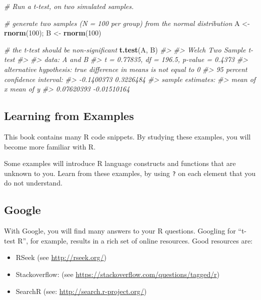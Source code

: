 \documentclass[]{book}
\newenvironment{Shaded}{\begin{snugshade}}{\end{snugshade}}
\newcommand{\KeywordTok}[1]{\textcolor[rgb]{0.13,0.29,0.53}{\textbf{#1}}}
\newcommand{\DecValTok}[1]{\textcolor[rgb]{0.00,0.00,0.81}{#1}}
\newcommand{\StringTok}[1]{\textcolor[rgb]{0.31,0.60,0.02}{#1}}
\newcommand{\CommentTok}[1]{\textcolor[rgb]{0.56,0.35,0.01}{\textit{#1}}}
\newcommand{\NormalTok}[1]{#1}
\begin{document}
\begin{Shaded}
\begin{Highlighting}[]
\CommentTok{# Run a t-test, on two simulated samples.}

\CommentTok{# generate two samples (N = 100 per group) from the normal distribution}
\NormalTok{A <-}\StringTok{ }\KeywordTok{rnorm}\NormalTok{(}\DecValTok{100}\NormalTok{); B <-}\StringTok{ }\KeywordTok{rnorm}\NormalTok{(}\DecValTok{100}\NormalTok{)}

\CommentTok{# the t-test should be non-significant }
\KeywordTok{t.test}\NormalTok{(A, B)}
\CommentTok{#> }
\CommentTok{#>  Welch Two Sample t-test}
\CommentTok{#> }
\CommentTok{#> data:  A and B}
\CommentTok{#> t = 0.77835, df = 196.5, p-value = 0.4373}
\CommentTok{#> alternative hypothesis: true difference in means is not equal to 0}
\CommentTok{#> 95 percent confidence interval:}
\CommentTok{#>  -0.1400373  0.3226484}
\CommentTok{#> sample estimates:}
\CommentTok{#>   mean of x   mean of y }
\CommentTok{#>  0.07620393 -0.01510164}
\end{Highlighting}
\end{Shaded}

\subsection{Learning from Examples}\label{learning-from-examples}

This book contains many R code snippets. By studying these examples, you
will become more familiar with R.

Some examples will introduce R language constructs and functions that
are unknown to you. Learn from these examples, by using \texttt{?} on
each element that you do not understand.

\subsection{Google}\label{google}

With Google, you will find many answers to your R questions. Googling
for ``t-test R'', for example, results in a rich set of online
resources. Good resources are:

\begin{itemize}
\item
  RSeek (see \url{http://rseek.org/})
\item
  Stackoverflow: (see
  \url{https://stackoverflow.com/questions/tagged/r})
\item
  SearchR (see: \url{http://search.r-project.org/})
\end{itemize}
\end{document}
